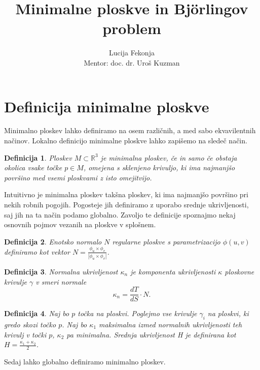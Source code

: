 \documentclass{article}
\author{Lucija Fekonja \\ Mentor: doc. dr. Uroš Kuzman}
\title{Minimalne ploskve in Björlingov problem}
\newtheorem{definicija}{Definicija}
\begin{document}
    \maketitle

    \section{Definicija minimalne ploskve}

    Minimalno ploskev lahko definiramo na osem različnih, a med sabo ekvavilentnih načinov.
    Lokalno definicijo minimalne ploskve lahko zapišemo na sledeč način.
    
    \begin{definicija}
        Ploskev $M \subset \mathbb{R}^3$ je \emph{minimalna ploskev}, če in samo če obstaja okolica vsake točke $p \in M$, omejena s 
        sklenjeno krivuljo, ki ima najmanjšo površino med vsemi ploskvami z isto omejitvijo.
    \end{definicija}
    
    
    Intuitivno je minimalna ploskev takšna ploskev, ki ima najmanjšo površino pri nekih robnih pogojih. 
    Pogosteje jih definiramo z uporabo srednje ukrivljenosti, saj jih na ta način podamo globalno.
    Zavoljo te definicije spoznajmo nekaj osnovnih pojmov vezanih na ploskve v splošnem.

    \begin{definicija}
        \emph{Enotsko normalo $N$} regularne ploskve s parametrizacijo $\phi(u, v)$ definiramo kot vektor $N = \frac{\phi_u \times \phi_v}{\left\lvert \phi_u \times \phi_v \right\rvert }$.
    \end{definicija}

    \begin{definicija}
        \emph{Normalna ukrivljenost $\kappa_n$} je komponenta ukrivljenosti $\kappa$ ploskovne krivulje $\gamma$ v smeri normale
        $$ \kappa_n = \frac{dT}{dS} \cdot N. $$
    \end{definicija}

    \begin{definicija}
        Naj bo $p$ točka na ploskvi. Poglejmo vse krivulje $\gamma_i$ na ploskvi, ki gredo skozi točko $p$. Naj bo $\kappa_1$ maksimalna izmed normalnih ukrivljenosti
        teh krivulj v točki $p$, $\kappa_2$ pa minimalna. 
        \emph{Srednja ukrivljenost H} je definirana kot $H = \frac{ \kappa_1 + \kappa_2 }{2}$.
    \end{definicija}
    
    Sedaj lahko globalno definiramo minimalno ploskev.
    
\end{document}
